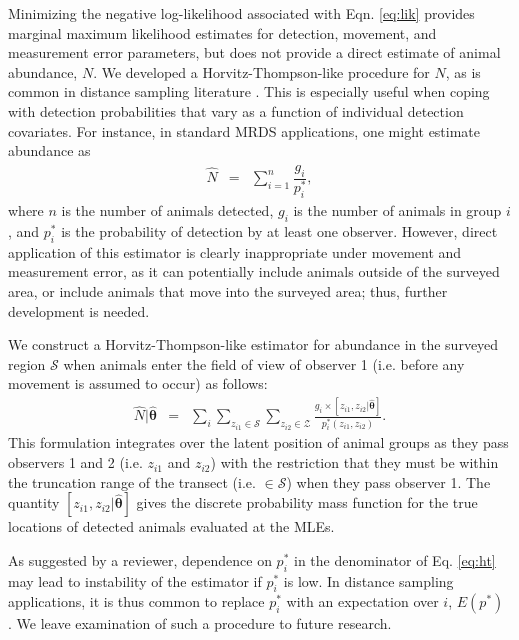 \documentclass[aoas,preprint]{imsart}
\numberwithin{equation}{section}
\theoremstyle{plain}
\begin{document}
Minimizing the negative log-likelihood associated with Eqn. \ref{eq:lik} provides marginal maximum likelihood estimates for detection, movement, and measurement error parameters, but does not provide a direct estimate of animal abundance, $N$.  We developed a Horvitz-Thompson-like procedure for $N$, as is common in distance sampling literature \citep[e.g.][]{BucklandEtAl2004}.  This is especially useful when coping with detection probabilities that vary as a function of individual detection covariates.  For instance, in standard MRDS applications, one might estimate abundance as
\begin{eqnarray*}
  \hat{N} & = & \sum_{i=1}^n \dfrac{g_i}{p_i^*},
\end{eqnarray*}
where $n$ is the number of animals detected, $g_i$ is the number of animals in group $i$, and $p_i^*$ is the probability of detection by at least one observer.
However, direct application of this estimator is clearly inappropriate under movement and measurement error, as it can potentially include animals outside of the surveyed area, or include animals that move into the surveyed area; thus, further development is needed.

We construct a Horvitz-Thompson-like estimator for abundance in the surveyed region $\mathcal{S}$ when animals enter the field of view of observer 1 (i.e. before any movement is assumed to occur) as follows:
\begin{eqnarray}
  \hat{N}|\hat{\boldsymbol{\theta}} & = & \sum_i \sum_{z_{i1} \in \mathcal{S}} \sum_{z_{i2} \in \mathcal{Z}} \frac{g_i \times [{z}_{i1},{z}_{i2} | \hat{\boldsymbol{\theta}}]}{p_i^*(z_{i1},z_{i2})}.
  \label{eq:ht}
\end{eqnarray}
This formulation integrates over the latent position of animal groups as they pass observers 1 and 2 (i.e. $z_{i1}$ and $z_{i2}$) with the restriction that they must be within the truncation range of the transect (i.e. $\in \mathcal{S}$) when they pass observer 1. The quantity $[{z}_{i1},{z}_{i2} | \hat{\boldsymbol{\theta}}]$ gives the discrete probability mass function for the true locations of detected animals evaluated at the MLEs.

As suggested by a reviewer, dependence on $p_i^*$ in the denominator of Eq. \ref{eq:ht} may lead to instability of the estimator if $p_i^*$ is low.  In distance sampling applications, it is thus common to replace $p_i^*$ with an expectation over $i$, $E(p^*)$ \citep[][Eq. 6.11]{LaakeBorchers2004}.
We leave examination of such a procedure to future research.
\end{document}
